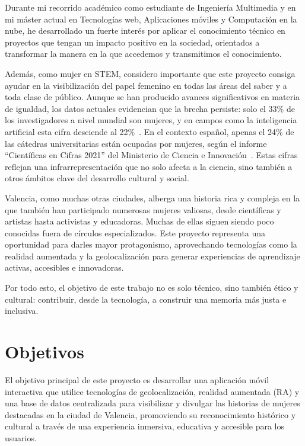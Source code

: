 Durante mi recorrido académico como estudiante de Ingeniería Multimedia y en mi máster actual en Tecnologías web, Aplicaciones móviles y Computación en la nube, he desarrollado un fuerte interés por aplicar el conocimiento técnico en proyectos que tengan un impacto positivo en la sociedad, orientados a transformar la manera en la que accedemos y transmitimos el conocimiento.

Además, como mujer en STEM, considero importante que este proyecto consiga ayudar en la visibilización del papel femenino en todas las áreas del saber y a toda clase de público. Aunque se han producido avances significativos en materia de igualdad, los datos actuales evidencian que la brecha persiste: solo el 33\% de los investigadores a nivel mundial son mujeres, y en campos como la inteligencia artificial esta cifra desciende al 22\%~\cite{unesco2021}. En el contexto español, apenas el 24\% de las cátedras universitarias están ocupadas por mujeres, según el informe “Científicas en Cifras 2021” del Ministerio de Ciencia e Innovación~\cite{cientificas2021}. Estas cifras reflejan una infrarrepresentación que no solo afecta a la ciencia, sino también a otros ámbitos clave del desarrollo cultural y social.

Valencia, como muchas otras ciudades, alberga una historia rica y compleja en la que también han participado numerosas mujeres valiosas, desde científicas y artistas hasta activistas y educadoras. Muchas de ellas siguen siendo poco conocidas fuera de círculos especializados. Este proyecto representa una oportunidad para darles mayor protagonismo, aprovechando tecnologías como la realidad aumentada y la geolocalización para generar experiencias de aprendizaje activas, accesibles e innovadoras.

Por todo esto, el objetivo de este trabajo no es solo técnico, sino también ético y cultural: contribuir, desde la tecnología, a construir una memoria más justa e inclusiva.

\section{Objetivos}
El objetivo principal de este proyecto es desarrollar una aplicación móvil interactiva que utilice tecnologías de geolocalización, realidad aumentada (RA) y una base de datos centralizada para visibilizar y divulgar las historias de mujeres destacadas en la ciudad de Valencia, promoviendo su reconocimiento histórico y cultural a través de una experiencia inmersiva, educativa y accesible para los usuarios.

